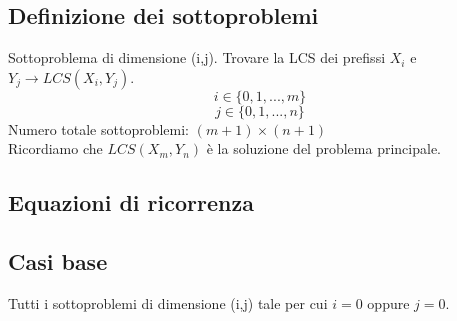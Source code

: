 \subsection{Definizione dei sottoproblemi}
 Sottoproblema di dimensione (i,j).
 Trovare la LCS dei prefissi $X_i$ e $Y_j \rightarrow LCS(X_i, Y_j)$.
 \[i \in \{0,1, ..., m\}\]
 \[j \in \{0,1,...,n\}\]
 Numero totale sottoproblemi: $(m+1)\times(n+1)$\\
 Ricordiamo che $LCS(X_m,Y_n)$ è la soluzione del problema principale.
 \subsection{Equazioni di ricorrenza}
 \subsection*{Casi base}
 Tutti i sottoproblemi di dimensione (i,j) tale per cui $i=0$ oppure $j=0$.

